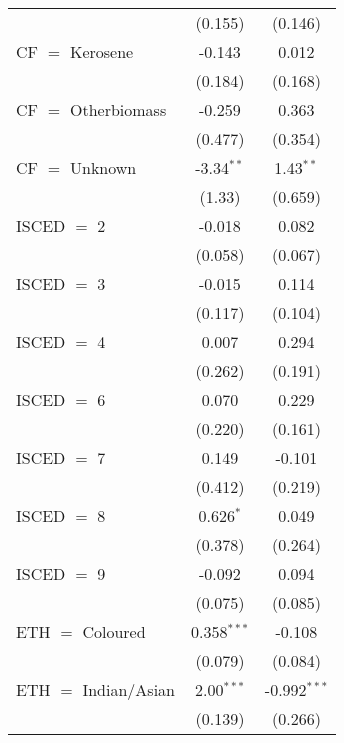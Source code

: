 \begin{table}[htbp!]
\begin{adjustbox}{width = 1\textwidth, max height = 0.95\textheight, center}
\begin{threeparttable}[b]
\begin{tabular}{lcc}
                                 & (0.155)        & (0.146)\\   
            CF $=$ Kerosene      & -0.143         & 0.012\\   
                                 & (0.184)        & (0.168)\\   
            CF $=$ Otherbiomass  & -0.259         & 0.363\\   
                                 & (0.477)        & (0.354)\\   
            CF $=$ Unknown       & -3.34$^{**}$   & 1.43$^{**}$\\   
                                 & (1.33)         & (0.659)\\   
            ISCED $=$ 2          & -0.018         & 0.082\\   
                                 & (0.058)        & (0.067)\\   
            ISCED $=$ 3          & -0.015         & 0.114\\   
                                 & (0.117)        & (0.104)\\   
            ISCED $=$ 4          & 0.007          & 0.294\\   
                                 & (0.262)        & (0.191)\\   
            ISCED $=$ 6          & 0.070          & 0.229\\   
                                 & (0.220)        & (0.161)\\   
            ISCED $=$ 7          & 0.149          & -0.101\\   
                                 & (0.412)        & (0.219)\\   
            ISCED $=$ 8          & 0.626$^{*}$    & 0.049\\   
                                 & (0.378)        & (0.264)\\   
            ISCED $=$ 9          & -0.092         & 0.094\\   
                                 & (0.075)        & (0.085)\\   
            ETH $=$ Coloured     & 0.358$^{***}$  & -0.108\\   
                                 & (0.079)        & (0.084)\\   
            ETH $=$ Indian/Asian & 2.00$^{***}$   & -0.992$^{***}$\\   
                                 & (0.139)        & (0.266)\\   

\end{tabular}
\end{threeparttable}
\end{adjustbox}
\end{table}
